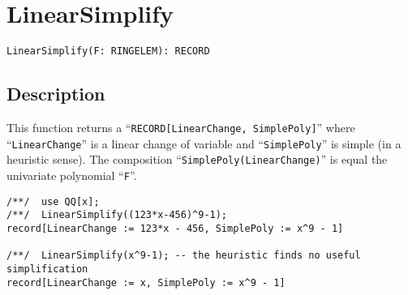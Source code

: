 \documentclass[a4paper]{mybook}
\newenvironment{command}{}{} %
\begin{document}
\section{LinearSimplify}
\label{LinearSimplify}
\begin{command} %


\begin{Verbatim}[label=syntax, rulecolor=\color{MidnightBlue},
frame=single]
LinearSimplify(F: RINGELEM): RECORD
\end{Verbatim}


\subsection*{Description}

This function returns a ``\verb&RECORD[LinearChange, SimplePoly]&''
where ``\verb&LinearChange&'' is a linear change of variable
and ``\verb&SimplePoly&'' is simple (in a heuristic sense).
The composition ``\verb&SimplePoly(LinearChange)&'' is equal the
univariate polynomial ``\verb&F&''.
\begin{Verbatim}[label=example, rulecolor=\color{PineGreen}, frame=single]
/**/  use QQ[x];
/**/  LinearSimplify((123*x-456)^9-1);
record[LinearChange := 123*x - 456, SimplePoly := x^9 - 1]

/**/  LinearSimplify(x^9-1); -- the heuristic finds no useful simplification
record[LinearChange := x, SimplePoly := x^9 - 1]
\end{Verbatim}


\end{command} %
\end{document}
